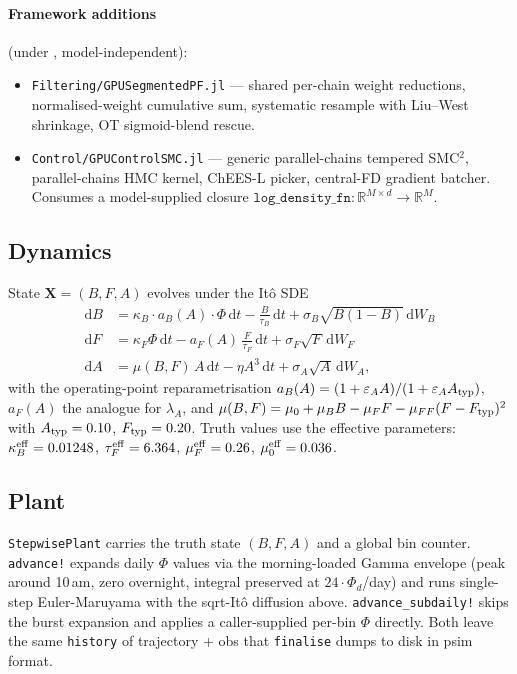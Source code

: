 \documentclass[11pt,a4paper]{article}
\begin{document}
\paragraph{Framework additions} (under
, model-independent):

\begin{itemize}[itemsep=2pt,leftmargin=*]
\item \texttt{Filtering/GPUSegmentedPF.jl} --- shared per-chain weight
  reductions, normalised-weight cumulative sum, systematic resample
  with Liu--West shrinkage, OT sigmoid-blend rescue.
\item \texttt{Control/GPUControlSMC.jl} --- generic parallel-chains
  tempered SMC$^2$, parallel-chains HMC kernel, ChEES-L picker,
  central-FD gradient batcher. Consumes a model-supplied closure
  $\texttt{log\_density\_fn} : \mathbb R^{M\times d} \to \mathbb R^M$.
\end{itemize}

\subsection{Dynamics}

State $\bm X = (B, F, A)$ evolves under the It\^o SDE
\begin{align*}
  \mathrm dB &= \kappa_B \cdot a_B(A) \cdot \Phi \,\mathrm dt
              - \tfrac{B}{\tau_B}\,\mathrm dt + \sigma_B \sqrt{B(1-B)}\,\mathrm dW_B \\
  \mathrm dF &= \kappa_F \Phi\,\mathrm dt - a_F(A)\,\tfrac{F}{\tau_F}\,\mathrm dt
              + \sigma_F \sqrt{F}\,\mathrm dW_F \\
  \mathrm dA &= \mu(B,F)\,A\,\mathrm dt - \eta A^3\,\mathrm dt
              + \sigma_A \sqrt{A}\,\mathrm dW_A,
\end{align*}
with the operating-point reparametrisation $a_B(A)=(1+\varepsilon_A
A)/(1+\varepsilon_A A_{\rm typ})$, $a_F(A)$ the analogue for $\lambda_A$,
and $\mu(B,F) = \mu_0 + \mu_B B - \mu_F F - \mu_{FF}(F-F_{\rm typ})^2$
with $A_{\rm typ}=0.10$, $F_{\rm typ}=0.20$. Truth values use the
effective parameters: $\kappa_B^{\rm eff}=0.01248$, $\tau_F^{\rm eff}=
6.364$, $\mu_F^{\rm eff}=0.26$, $\mu_0^{\rm eff}=0.036$.

\subsection{Plant}

\texttt{StepwisePlant} carries the truth state $(B,F,A)$ and a global bin
counter. \texttt{advance!} expands daily $\Phi$ values via the
morning-loaded Gamma envelope (peak around 10\,am, zero overnight,
integral preserved at $24\cdot \Phi_d$/day) and runs single-step
Euler-Maruyama with the sqrt-It\^o diffusion above.
\texttt{advance\_subdaily!} skips the burst expansion and applies a
caller-supplied per-bin $\Phi$ directly. Both leave the same
\texttt{history} of trajectory + obs that \texttt{finalise} dumps to
disk in psim format.
\end{document}
